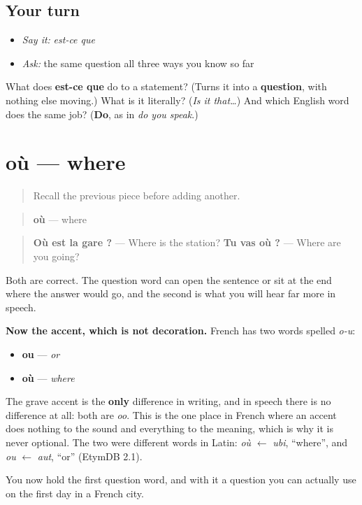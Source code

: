 \subsection*{Your turn}
\begin{itemize}
\raggedright
  \item \emph{Say it:} \emph{est-ce que}
  \item \emph{Ask:} the same question all three ways you know so far
\end{itemize}

\begin{tcolorbox}[breakable,colback=teal!4,colframe=teal!35!black,title={Before you move on}]
What does \textbf{est-ce que} do to a statement? (Turns it into a \textbf{question}, with nothing else moving.) What is it literally? (\emph{Is it that…}) And which English word does the same job? (\textbf{Do}, as in \emph{do you speak}.)
\end{tcolorbox}
\section[où]{où — where}

\label{lesson:FR-C32-ou}



\begin{quote}
Recall the previous piece before adding another.
\end{quote}

\begin{cousinweb}
\begin{quote}
\textbf{où} — where
\end{quote}

\begin{quote}
\textbf{Où est la gare ?} — Where is the station? \textbf{Tu vas où ?} — Where are you going?
\end{quote}

Both are correct. The question word can open the sentence or sit at the end where the answer would go, and the second is what you will hear far more in speech.

\textbf{Now the accent, which is not decoration.} French has two words spelled \emph{o-u}:

\begin{itemize}
\raggedright
  \item \textbf{ou} — \emph{or}
  \item \textbf{où} — \emph{where}
\end{itemize}

The grave accent is the \textbf{only} difference in writing, and in speech there is no difference at all: both are \emph{oo}. This is the one place in French where an accent does nothing to the sound and everything to the meaning, which is why it is never optional. The two were different words in Latin: \emph{où} $\leftarrow$ \emph{ubi}, \textquotedblleft{}where\textquotedblright{}, and \emph{ou} $\leftarrow$ \emph{aut}, \textquotedblleft{}or\textquotedblright{} (EtymDB 2.1).

You now hold the first question word, and with it a question you can actually use on the first day in a French city.
\end{cousinweb}


